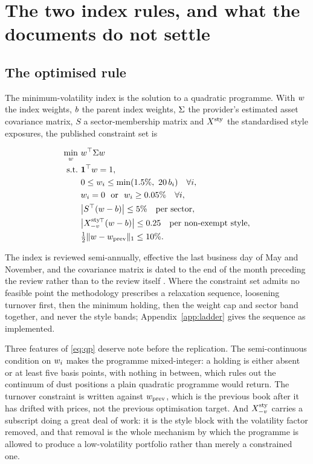 \section{The two index rules, and what the documents do not settle}
\label{sec:rules}

\subsection{The optimised rule}
The minimum-volatility index is the solution to a quadratic programme. With
$w$ the index weights, $b$ the parent index weights, $\Sigma$ the
provider's estimated asset covariance matrix, $S$ a sector-membership matrix
and $X^{\mathrm{sty}}$ the standardised style exposures, the published constraint set is

\begin{align}
 \min_{w}\ & w^{\top}\Sigma w \label{eq:qp}\\
 \text{s.t.}\ & \mathbf{1}^{\top}w = 1, \nonumber\\
 & 0 \le w_i \le \min(1.5\%,\ 20\,b_i) \quad \forall i, \nonumber\\
 & w_i = 0 \ \text{ or } \ w_i \ge 0.05\% \quad \forall i, \nonumber\\
 & \bigl|S^{\top}(w-b)\bigr| \le 5\% \quad \text{per sector},
   \nonumber\\
 & \bigl|X^{\mathrm{sty}}_{-v}{}^{\!\top}(w-b)\bigr| \le 0.25 \quad
   \text{per non-exempt style}, \nonumber\\
 & \tfrac{1}{2}\lVert w-w_{\rm prev}\rVert_1 \le 10\%. \nonumber
\end{align}

The index is reviewed semi-annually, effective the last business day of May and
November, and the covariance matrix is dated to the end of the month preceding
the review rather than to the review itself \citep{msci2012minvol}. Where the
constraint set admits no feasible point the methodology prescribes a relaxation
sequence, loosening turnover first, then the minimum holding, then the weight
cap and sector band together, and never the style bands; Appendix~\ref{app:ladder}
gives the sequence as implemented.

Three features of \eqref{eq:qp} deserve note before the replication. The
semi-continuous condition on $w_i$ makes the programme mixed-integer: a
holding is either absent or at least five basis points, with nothing in
between, which rules out the continuum of dust positions a plain quadratic
programme would return. The turnover constraint is written against
$w_{\rm prev}$, which is the previous book after it has drifted with
prices, not the previous optimisation target. And $X^{\mathrm{sty}}_{-v}$ carries a
subscript doing a great deal of work: it is the style block with the volatility
factor removed, and that removal is the whole mechanism by which the programme
is allowed to produce a low-volatility portfolio rather than merely a
constrained one.

